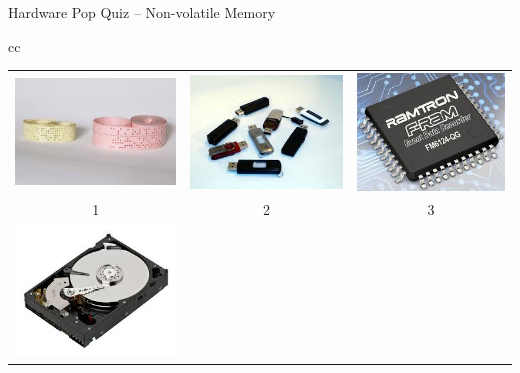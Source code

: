\documentclass[compress,11pt,xcolor=svgnames,aspectratio=169]{beamer}
\begin{document}
\begin{frame}[t]{Hardware Pop Quiz -- Non-volatile Memory}

\begin{center}

\begin{tabular}{cc}

\begin{tabular}{ccc}
\includegraphics[scale=0.15]{fig/paper-tape} &
\includegraphics[scale=0.15]{fig/usb} &
\includegraphics[scale=0.15]{fig/fram} \\
1 & 2 & 3 \\
\includegraphics[scale=0.15]{fig/disk} &

\end{tabular}
\end{tabular}
\end{center}
\end{frame}
\end{document}
